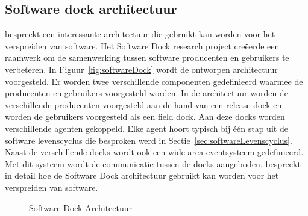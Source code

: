 \subsection{Software dock architectuur}\label{sec:softwareDock}
\citet{hall1999cooperative} bespreekt een interessante architectuur die gebruikt kan worden voor het verspreiden van software.
Het Software Dock research project creëerde een raamwerk om de samenwerking tussen software producenten en gebruikers te verbeteren.
In Figuur~\vref{fig:softwareDock} wordt de ontworpen architectuur voorgesteld.
Er worden twee verschillende componenten gedefinieerd waarmee de producenten en gebruikers voorgesteld worden.
In de architectuur worden de verschillende producenten voorgesteld aan de hand van een release dock en worden de gebruikers voorgesteld als een field dock.
Aan deze docks worden verschillende agenten gekoppeld.
Elke agent hoort typisch bij één stap uit de software levenscyclus die besproken werd in Sectie~\ref{sec:softwareLevenscyclus}.
Naast de verschillende docks wordt ook een wide-area eventsysteem gedefinieerd.
Met dit systeem wordt de communicatie tussen de docks aangeboden.
\citet{hall1997architecture} bespreekt in detail hoe de Software Dock architectuur gebruikt kan worden voor het verspreiden van software.

\begin{figure}[!ht]
\centering
{}
\caption{Software Dock Architectuur \citep{hall1999cooperative}}
\label{fig:softwareDock}
\end{figure}


